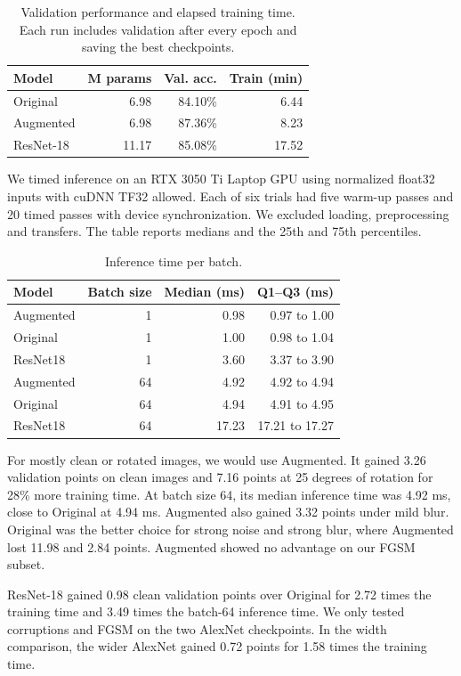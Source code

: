 \documentclass[11pt,a4paper]{article}
\begin{document}
\begin{table}[htbp]\centering\small
\caption{Validation performance and elapsed training time. Each run includes validation after every epoch and saving the best checkpoints.}
\begin{tabular}{lrrr}
\toprule
Model & M params & Val. acc. & Train (min)\\
\midrule
Original & 6.98 & 84.10\% & 6.44\\
Augmented & 6.98 & 87.36\% & 8.23\\
ResNet-18 & 11.17 & 85.08\% & 17.52\\
\bottomrule\end{tabular}\end{table}
We timed inference on an RTX 3050 Ti Laptop GPU using normalized float32 inputs with cuDNN TF32 allowed. Each of six trials had five warm-up passes and 20 timed passes with device synchronization. We excluded loading, preprocessing and transfers. The table reports medians and the 25th and 75th percentiles.

\begin{table}[htbp]\centering\small
\caption{Inference time per batch.}
\begin{tabular}{lrrr}
\toprule
Model & Batch size & Median (ms) & Q1--Q3 (ms)\\
\midrule
Augmented & 1 & 0.98 & 0.97 to 1.00\\
Original & 1 & 1.00 & 0.98 to 1.04\\
ResNet18 & 1 & 3.60 & 3.37 to 3.90\\
Augmented & 64 & 4.92 & 4.92 to 4.94\\
Original & 64 & 4.94 & 4.91 to 4.95\\
ResNet18 & 64 & 17.23 & 17.21 to 17.27\\
\bottomrule\end{tabular}\end{table}
For mostly clean or rotated images, we would use Augmented. It gained 3.26 validation points on clean images and 7.16 points at 25 degrees of rotation for 28\% more training time. At batch size 64, its median inference time was 4.92 ms, close to Original at 4.94 ms. Augmented also gained 3.32 points under mild blur. Original was the better choice for strong noise and strong blur, where Augmented lost 11.98 and 2.84 points. Augmented showed no advantage on our FGSM subset.

ResNet-18 gained 0.98 clean validation points over Original for 2.72 times the training time and 3.49 times the batch-64 inference time. We only tested corruptions and FGSM on the two AlexNet checkpoints. In the width comparison, the wider AlexNet gained 0.72 points for 1.58 times the training time.
\end{document}
